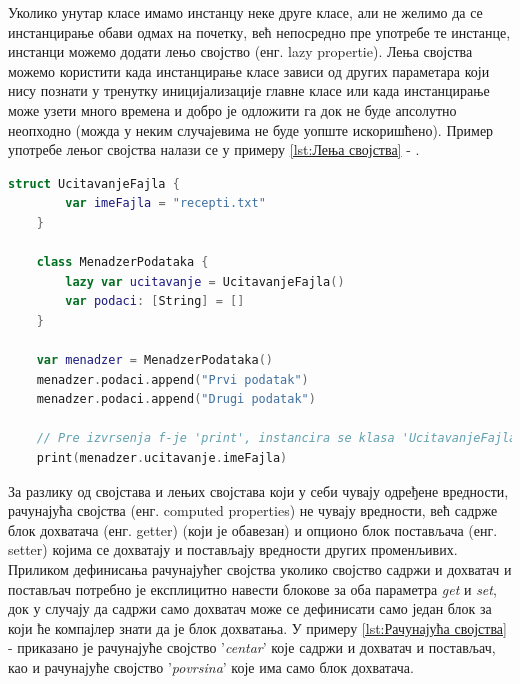 \documentclass[12pt,oneside]{memoir}
\begin{document}
\indent Уколико унутар класе имамо инстанцу неке друге класе, али не желимо да се инстанцирање обави одмах на почетку, већ непосредно пре употребе те инстанце, инстанци можемо додати лењо својство (енг. lazy propertie). Лења својства можемо користити када инстанцирање класе зависи од других параметара који нису познати у тренутку иницијализације главне класе или када инстанцирање може узети много времена и добро је одложити га док не буде апсолутно неопходно (можда у неким случајевима не буде уопште искоришћено). Пример употребе лењог својства налази се у примеру \ref{lst:Лења својства} - .

\begin{lstlisting}[caption=\textit{{Лења својства}}, label={lst:Лења својства}, language=Swift, frame=single]
    struct UcitavanjeFajla {
        var imeFajla = "recepti.txt"
    }
    
    class MenadzerPodataka {
        lazy var ucitavanje = UcitavanjeFajla()
        var podaci: [String] = []
    }
    
    var menadzer = MenadzerPodataka()
    menadzer.podaci.append("Prvi podatak")
    menadzer.podaci.append("Drugi podatak")
    
    // Pre izvrsenja f-je 'print', instancira se klasa 'UcitavanjeFajla'
    print(menadzer.ucitavanje.imeFajla)
\end{lstlisting}

\indent За разлику од својстава и лењих својстава који у себи чувају одређене вредности, рачунајућа својства (енг. computed properties) не чувају вредности, већ садрже блок дохватача (енг. getter) (који је обавезан) и опционо блок постављача (енг. setter) којима се дохватају и постављају вредности других променљивих. Приликом дефинисања рачунајућег својства уколико својство садржи и дохватач и постављач потребно је експлицитно навести блокове за оба параметра \textit{get} и \textit{set}, док у случају да садржи само дохватач може се дефинисати само један блок за који ће компајлер знати да је блок дохватања. У примеру \ref{lst:Рачунајућа својства} -  приказано је рачунајуће својство '\textit{centar}' које садржи и дохватач и постављач, као и рачунајуће својство '\textit{povrsina}' које има само блок дохватача.
\end{document}
